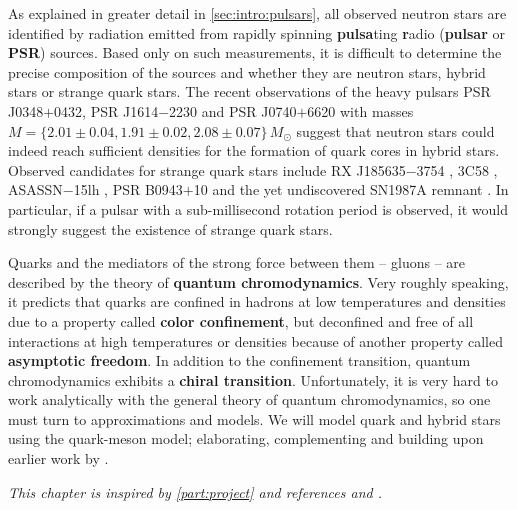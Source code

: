 As explained in greater detail in \cref{sec:intro:pulsars},
all observed neutron stars are identified by radiation emitted from rapidly spinning \textbf{pulsa}ting \textbf{r}adio (\textbf{pulsar} or \textbf{PSR}) sources.
Based only on such measurements, it is difficult to determine the precise composition of the sources and whether they are neutron stars, hybrid stars or strange quark stars.
The recent observations \cite{ref:antoniadis,ref:arzoumanian,ref:fonseca}
of the heavy pulsars PSR J0348$+$0432, PSR J1614$-$2230 and PSR J0740$+$6620
with masses $M = \{2.01 \pm 0.04, 1.91 \pm 0.02, 2.08 \pm 0.07\} \, M_\odot$ 
suggest that neutron stars could indeed reach sufficient densities for the formation of quark cores in hybrid stars.
Observed candidates for strange quark stars include
RX J185635$-$3754 \cite{ref:RXJ1856}, 
3C58 \cite{ref:3c58}, 
ASASSN$-$15lh \cite{ref:ASASSN}, 
PSR B0943$+$10 \cite{ref:PSRB0943}
and the yet undiscovered SN1987A remnant \cite{ref:SN1987A_1,ref:SN1987A_2}.
In particular, if a pulsar with a sub-millisecond rotation period is observed,
it would strongly suggest the existence of strange quark stars. \cite{ref:glendenning} %

Quarks and the mediators of the strong force between them -- gluons -- are described by the theory of \textbf{quantum chromodynamics}.
Very roughly speaking, it predicts that quarks are confined in hadrons at low temperatures and densities due to a property called \textbf{color confinement},
but deconfined and free of all interactions at high temperatures or densities because of another property called \textbf{asymptotic freedom}.
In addition to the confinement transition, quantum chromodynamics exhibits a \textbf{chiral transition}.
Unfortunately, it is very hard to work analytically with the general theory of quantum chromodynamics,
so one must turn to approximations and models.
We will model quark and hybrid stars using the quark-meson model;
elaborating, complementing and building upon earlier work by \cite{ref:master_berge}.

\textit{This chapter is inspired by \cref{part:project} and references \cite{ref:glendenning} and \cite{ref:schwartz}.}

\section{\texorpdfstring{}{The Tolman-Oppenheimer-Volkoff equation and stellar stability}}
\label{sec:master_intro:tov}

